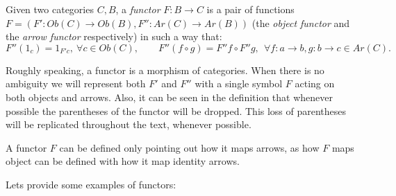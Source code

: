 \begin{definition}
  Given two categories $C, B$, a \emph{functor} $F: B \to C$ is a pair of functions $F=(F':Ob(C)\to Ob(B),F'':Ar(C)\to Ar(B))$ (the \emph{object functor} and the \emph{arrow functor} respectively) in such a way that:
  $$F''(1_c) = 1_{F'c}, \ \forall c \in Ob(C), \qquad F''(f\circ g) = F''f \circ F''g, \ \ \forall f:a\to b,g: b\to c  \in Ar(C).$$

\end{definition}


Roughly speaking,  a functor is a morphism of categories. When there is no ambiguity we will represent both $F'$ and $F''$ with a single symbol $F$ acting on both objects and arrows. Also, it can be seen in the definition that whenever possible the parentheses of the functor will be dropped. This loss of parentheses will be replicated throughout the text, whenever possible.\\



\begin{remark}
  A functor $F$ can be defined only pointing out how it maps arrows, as how $F$ maps object can be defined with how it map identity arrows.
\end{remark}
Lets provide some examples of functors:\\



